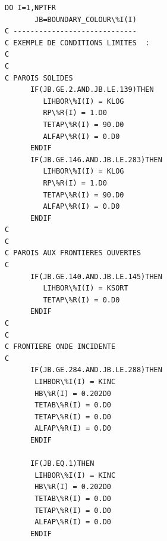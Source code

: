 \begin{lstlisting}[language=TelFortran]
      DO I=1,NPTFR
       JB=BOUNDARY_COLOUR\%I(I)
C -----------------------------
C EXEMPLE DE CONDITIONS LIMITES  :
C
C
C PAROIS SOLIDES
      IF(JB.GE.2.AND.JB.LE.139)THEN
         LIHBOR\%I(I) = KLOG
         RP\%R(I) = 1.D0
         TETAP\%R(I) = 90.D0
         ALFAP\%R(I) = 0.D0
      ENDIF
      IF(JB.GE.146.AND.JB.LE.283)THEN
         LIHBOR\%I(I) = KLOG
         RP\%R(I) = 1.D0
         TETAP\%R(I) = 90.D0
         ALFAP\%R(I) = 0.D0
      ENDIF
C
C
C PAROIS AUX FRONTIERES OUVERTES
C
      IF(JB.GE.140.AND.JB.LE.145)THEN
         LIHBOR\%I(I) = KSORT
         TETAP\%R(I) = 0.D0
      ENDIF
C
C
C FRONTIERE ONDE INCIDENTE
C
      IF(JB.GE.284.AND.JB.LE.288)THEN
       LIHBOR\%I(I) = KINC
       HB\%R(I) = 0.202D0
       TETAB\%R(I) = 0.D0
       TETAP\%R(I) = 0.D0
       ALFAP\%R(I) = 0.D0
      ENDIF

      IF(JB.EQ.1)THEN
       LIHBOR\%I(I) = KINC
       HB\%R(I) = 0.202D0
       TETAB\%R(I) = 0.D0
       TETAP\%R(I) = 0.D0
       ALFAP\%R(I) = 0.D0
      ENDIF


\end{lstlisting}
